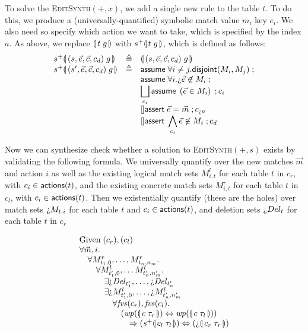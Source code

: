 To solve the \textsc{EditSynth}$(+,x)$, we add a single new rule to the table
$t$. To do this, we produce a (universally-quantified) symbolic match value
$m_i$ key $e_i$. We also need so specify which action we want to take, which is
specified by the index $a$. As above, we replace $\llparenthesis\, t\;g\, \rrparenthesis$ with
$s^+\llparenthesis\, t\; g\, \rrparenthesis$, which is defined as follows:
\[\begin{array}{lcl}
    s^+\parenbb{(s,\vec e, \vec c, c_d) \; g}
    &\triangleq
    & \parenbb{(s,\vec e, \vec c, c_d) \; g} \\
    s^+\parenbb{(s',\vec e, \vec c, c_d) \; g}
    &\triangleq
    & \assume{\forall i\neq j. \mathsf{disjoint}(M_i,M_j)}; \\
    && \assume{\forall i. \hole{\vec e} \not\in M_i};\\
    && \displaystyle \Angel_{c_i}
       \assume{\left(\vec e \in M_i\right)}; c_i\\
    && \displaystyle \angel \assert{\vec e = \vec m}; c_{\hole a}\\
    && \displaystyle \angel \assert{\bigwedge_{c_i} \vec e \not\in M_i}; c_d
\end{array}\]

Now we can synthesize check whether a solution to \textsc{EditSynth}$(+,s)$
exists by validating the following formula. We universally quantify over the new
matches $\vec m$ and action $i$ as well as the existing logical match sets
$M^l_{i,t}$ for each table $t$ in $c_r$, with $c_i \in \mathsf{actions}(t)$, and the
existing concrete match sets $M^r_{i,t}$ for each table $t$ in $c_l$, with
$c_i \in \mathsf{actions}(t)$. Then we existentially quantify (these are the holes) over
match sets $\hole{M_{t,i}}$ for each table $t$ and $c_i \in \mathsf{actions}(t)$, and
deletion sets $\hole{Del_t}$ for each table $t$ in $c_r$

\[\begin{array}{l}
    \text{Given}\; (c_r), (c_l) \\
    \forall \vec m, i.\\
    \quad \forall M^r_{t_1,0},\ldots,M^r_{t_n,n_m}. \\
    \qquad \forall M^l_{t'_1,0}, \ldots M^l_{t'_n,n'_m}. \\
    \qquad \quad \exists \hole{\mathit{Del}_{t'_1}}, \ldots,
    \hole{\mathit{Del}_{t'_n}} \\
    \qquad \quad \exists \hole{M^l_{t'_1,0}},\ldots, \hole{M^l_{t'_n,n'_m}}\\
    \qquad \qquad \forall \fvs(c_r),\fvs(c_l).\\
    \qquad \qquad \quad (\wp(\parenbb{c\; \tau_r}) \Leftrightarrow \wp(\parenbb{c\; \tau_l})) \\
    \qquad \qquad \qquad \Rightarrow (s^+\parenbb{c_l\; \tau_l}) \Leftrightarrow (\hole\parenbb{c_r\; \tau_r}) \\
  \end{array}\]


